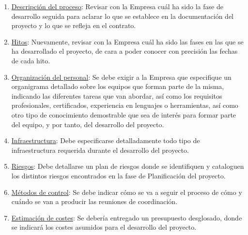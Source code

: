 \documentclass[a4paper,12pt]{report}
\begin{document}
\begin{enumerate}
\begin{enumerate}
                \item  \hyperref[proceso]{Descripción del proceso}: Revisar con la Empresa cuál
                ha sido la fase de desarrollo seguida para aclarar lo que se establece en la
                documentación del proyecto y lo que se refleja en el contrato.
                
                \item  \hyperref[hitos]{Hitos}: Nuevamente, revisar con la Empresa cuál ha
                sido las fases en las que se ha desarrollado el proyecto, de cara a poder conocer
                con precisión las fechas de cada hito.
                
                \item  \hyperref[tareas]{Organización del personal}: Se debe
                exigir a la Empresa que especifique un organigrama detallado sobre 
                los equipos que forman parte de la misma, indicando las diferentes tareas
                que van abordar, así como los requisitos profesionales, certificados, experiencia
                en lenguajes o herramientas, así como otro tipo de conocimiento demostrable que
                sea de interés para formar parte del equipo, y por tanto, del desarrollo del proyecto.
                
                \item \hyperref[infraestructura] {Infraestructura}: Debe especificarse detalladamente
                todo tipo de infraestructura requerida durante el desarrollo del proyecto.
                
                \item \hyperref[riesgos] {Riesgos}: Debe detallarse un plan de riesgos donde se
                identifiquen y cataloguen los distintos riesgos encontrados en la fase de
                Planificación del proyecto.
                
                \item \hyperref[control] {Métodos de control}: Se debe indicar cómo se va a seguir
                el proceso de cómo y cuándo se van a producir las reuniones de coordinación.
                
                \item \hyperref[costes] {Estimación de costes}: Se debería entregado
                un presupuesto desglosado, donde se indicará los costes asumidos
                para el desarrollo del proyecto.\\
            \end{enumerate}


\end{enumerate}
\end{document}
